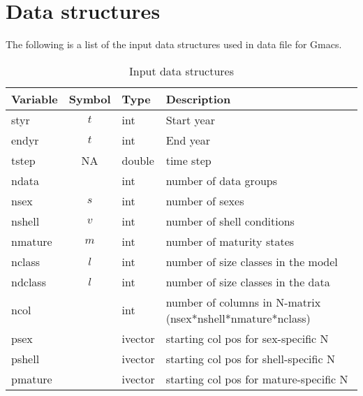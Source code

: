 \section{Data structures}
The following is a list of the input data structures used in data file for Gmacs.

\begin{table}[!tbh]
	\caption{Input data structures}\label{Tab:inputDataStructures}
	\begin{tabular}{lcll}
	\hline
	Variable & Symbol & Type & Description \\
	\hline
	styr & $t$      & int  & Start year  \\
	endyr & $t$     & int  & End year    \\
	tstep & NA    & double & time step \\
	ndata &  &  int        & number of data groups \\
	nsex  & $s$   & int    & number of sexes \\
	nshell & $v$  & int    & number of shell conditions\\
	nmature & $m$ & int    & number of maturity states \\
	nclass & $l$ & int & number of size classes in the model\\
	ndclass & $l$ & int & number of size classes in the data\\
	ncol & & int & number of columns in N-matrix (nsex*nshell*nmature*nclass)\\
	psex & & ivector& starting col pos for sex-specific N\\
	pshell && ivector& starting col pos for shell-specific N\\
	pmature &&ivector&starting col pos for mature-specific N\\
	\hline         
	\end{tabular}
\end{table}